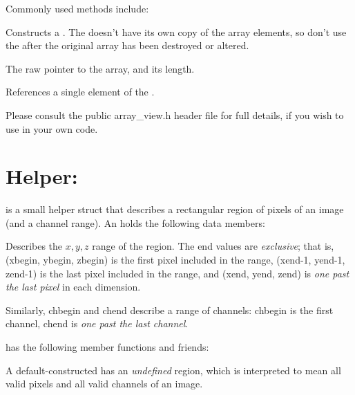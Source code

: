 \noindent Commonly used \arrayview methods include:

Constructs a \arrayview.  The \arrayview doesn't have its own copy of the
array elements, so don't use the \arrayview after the original array has been
destroyed or altered.
\apiend

The raw pointer to the array, and its length.
\apiend

References a single element of the \arrayview.
\apiend

\smallskip
\noindent Please consult the public {\cf array_view.h}
header file for full details, if you wish to use \arrayview in your own
code.


\section{Helper: \ROI}
\label{sec:ROI}

\ROI is a small helper struct that describes a rectangular region of
pixels of an image (and a channel range).  An \ROI holds the following
data members:

Describes the $x, y, z$ range of the region.  The {\cf end} values are
\emph{exclusive}; that is, ({\cf xbegin, ybegin, zbegin}) is the first
pixel included in the range, ({\cf xend-1, yend-1, zend-1}) is the last
pixel included in the range, and ({\cf xend, yend, zend}) is \emph{one
past the last pixel} in each dimension.

Similarly, {\cf chbegin} and {\cf chend} describe a range of channels:
{\cf chbegin} is the first channel, {\cf chend} is \emph{one past the last
channel}.
\apiend

\smallskip

\noindent \ROI has the following member functions and friends:

\smallskip

A default-constructed \ROI has an \emph{undefined} region, which
is interpreted to mean all valid pixels and all valid channels of
an image.
\apiend

